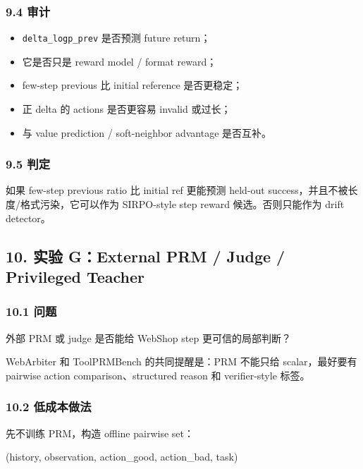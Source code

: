 \documentclass[
  10pt,
]{ctexart}
\newenvironment{Shaded}{}{}
\newcommand{\NormalTok}[1]{#1}
\providecommand{\tightlist}{%
  \setlength{\itemsep}{0pt}\setlength{\parskip}{0pt}}
\begin{document}
\subsubsection{9.4 审计}\label{ux5ba1ux8ba1}

\begin{itemize}
\tightlist
\item
  \texttt{delta\_logp\_prev} 是否预测 future return；
\item
  它是否只是 reward model / format reward；
\item
  few-step previous 比 initial reference 是否更稳定；
\item
  正 delta 的 actions 是否更容易 invalid 或过长；
\item
  与 value prediction / soft-neighbor advantage 是否互补。
\end{itemize}

\subsubsection{9.5 判定}\label{ux5224ux5b9a-5}

如果 few-step previous ratio 比 initial ref 更能预测 held-out
success，并且不被长度/格式污染，它可以作为 SIRPO-style step reward
候选。否则只能作为 drift detector。

\subsection{10. 实验 G：External PRM / Judge / Privileged
Teacher}\label{ux5b9eux9a8c-gexternal-prm-judge-privileged-teacher}

\subsubsection{10.1 问题}\label{ux95eeux9898-7}

外部 PRM 或 judge 是否能给 WebShop step 更可信的局部判断？

WebArbiter 和 ToolPRMBench 的共同提醒是：PRM 不能只给 scalar，最好要有
pairwise action comparison、structured reason 和 verifier-style 标签。

\subsubsection{10.2 低成本做法}\label{ux4f4eux6210ux672cux505aux6cd5}

先不训练 PRM，构造 offline pairwise set：

\begin{Shaded}
\begin{Highlighting}[]
\NormalTok{(history, observation, action\_good, action\_bad, task)}
\end{Highlighting}
\end{Shaded}
\end{document}
